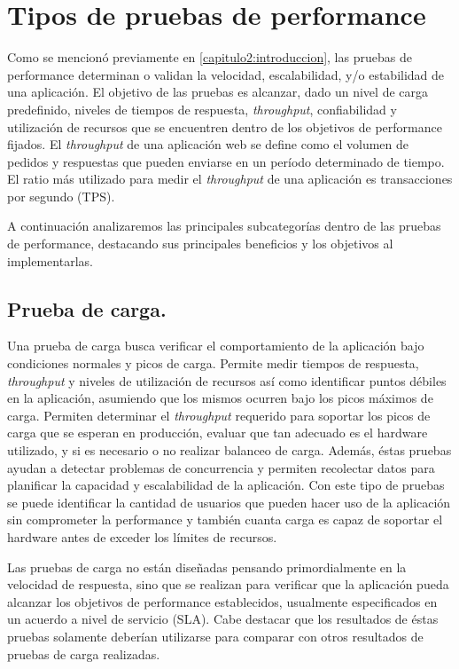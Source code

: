 \section{Tipos de pruebas de performance}
\label{capitulo2:tipos_pruebas}
	Como se mencionó previamente en \ref{capitulo2:introduccion}, las pruebas de performance determinan o validan la velocidad, escalabilidad, y/o estabilidad de una aplicación. 
El objetivo de las pruebas es alcanzar, dado un nivel de carga predefinido, niveles de tiempos de respuesta,
\emph{throughput}, confiabilidad y utilización de recursos que se encuentren dentro de los objetivos de performance fijados. 
El \emph{throughput} de una aplicación web se define como el volumen de pedidos y respuestas que pueden enviarse en un período determinado de tiempo. El ratio más utilizado para medir el \emph{throughput} de una aplicación es transacciones por segundo (TPS). 

A continuación analizaremos las principales subcategorías dentro de las pruebas de performance, destacando sus principales beneficios y los objetivos al implementarlas.

	\subsection{Prueba de carga.}
	Una prueba de carga busca verificar el comportamiento de la aplicación bajo condiciones normales y picos de carga. Permite medir tiempos de respuesta, \emph{throughput} y niveles de utilización de recursos así como identificar puntos débiles en la aplicación, asumiendo que los mismos ocurren bajo los picos máximos de carga.
	Permiten determinar el \emph{throughput} requerido para soportar los picos de carga que se esperan en producción, evaluar que tan adecuado es el hardware utilizado, y si es necesario o no realizar balanceo de carga.
	Además, éstas pruebas ayudan a detectar problemas de concurrencia y permiten recolectar datos para planificar la capacidad y escalabilidad de la aplicación. Con este tipo de pruebas se puede identificar la cantidad de usuarios que pueden hacer uso de la aplicación sin comprometer la performance y también cuanta carga es capaz de soportar el hardware antes de exceder los límites de recursos.
	
	Las pruebas de carga no están diseñadas pensando primordialmente en la velocidad de respuesta, sino que se realizan para verificar que la aplicación pueda alcanzar los objetivos de performance establecidos, usualmente especificados en un acuerdo a nivel de servicio (SLA). Cabe destacar que los resultados de éstas pruebas solamente deberían utilizarse para comparar con otros resultados de pruebas de carga realizadas.

